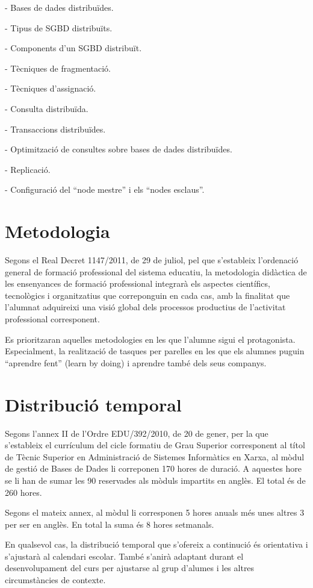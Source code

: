\documentclass[catalan, a4paper, 12pt, titlepage]{article}
\begin{document}
- Bases de dades distribuïdes.

- Tipus de SGBD distribuïts.

- Components d'un SGBD distribuït.

- Tècniques de fragmentació.

- Tècniques d'assignació.

- Consulta distribuïda.

- Transaccions distribuïdes.

- Optimització de consultes sobre bases de dades distribuïdes.

- Replicació.

- Configuració del ``node mestre'' i els ``nodes esclaus''.

\section{Metodologia}

Segons el Real Decret 1147/2011, de 29 de juliol, pel que s'estableix l'ordenació general de formació professional del sistema educatiu, la metodologia didàctica de les ensenyances de formació professional integrarà els aspectes científics, tecnològics i organitzatius que correponguin en cada cas, amb la finalitat que l'alumnat adquireixi una visió global dels processos productius de l'activitat professional corresponent.

Es prioritzaran aquelles metodologies en les que l'alumne sigui el protagonista. Especialment, la realització de tasques per parelles en les que els alumnes puguin ``aprendre fent'' (learn by doing) i aprendre també dels seus companys.

\section{Distribució temporal}

Segons l'annex II de l'Ordre EDU/392/2010, de 20 de gener, per la que s'estableix el currículum del cicle formatiu de Grau Superior corresponent al títol de Tècnic Superior en Administració de Sistemes Informàtics en Xarxa, al mòdul de gestió de Bases de Dades li correponen 170 hores de duració. A aquestes hore se li han de sumar les 90 reservades als mòduls impartits en anglès. El total és de 260 hores.

Segons el mateix annex, al mòdul li corresponen 5 hores anuals més unes altres 3 per ser en anglès. En total la suma és 8 hores setmanals.

En qualsevol cas, la distribució temporal que s'ofereix a continució és orientativa i s'ajustarà al calendari escolar. També s'anirà adaptant durant el desenvolupament del curs per ajustarse al grup d'alumes i les altres circumstàncies de contexte.
\end{document}
